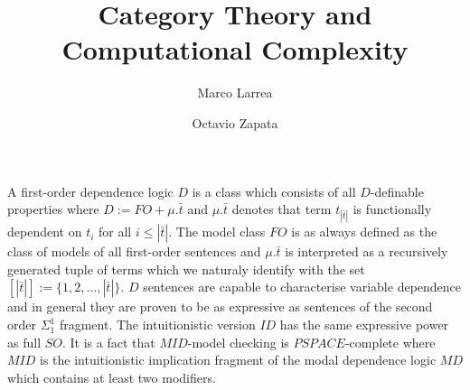

\title{Category Theory and \\ Computational Complexity}
\author{Marco Larrea \and Octavio Zapata}


\maketitle
A first-order dependence logic $D$ is a class which consists of all $D$-definable properties where 
$D := FO + \mu.\bar{t}$ and $\mu.\bar{t}$ denotes that term $t_{|\bar{t}|}$ is functionally dependent on 
$t_{i}$ for all $i\leq |\bar{t}|$. The model class $FO$ is as always defined as the class of models of all 
first-order sentences and $\mu.\bar{t}$ is interpreted as a recursively generated tuple of terms which we 
naturaly identify with the set $[|\bar{t}|] := \{1,2,\dots,|\bar{t}|\}$. $D$ sentences are capable to characterise 
variable dependence and in general they are proven to be as expressive as sentences of the second order $\Sigma_1^1$ 
fragment. The intuitionistic version $ID$ has the same expressive power as full $SO$. It is a fact that $MID$-model 
checking is $PSPACE$-complete where $MID$ is the intuitionistic implication fragment of the modal dependence logic 
$MD$ which contains at least two modifiers. 

\nocite{*}




